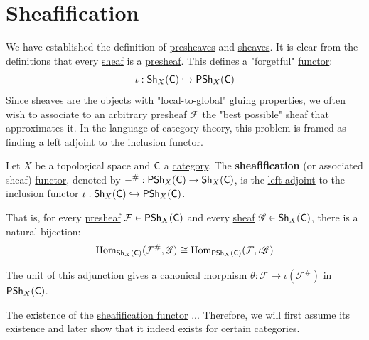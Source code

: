 \documentclass[../../../main]{subfiles}
\begin{document}
\section{Sheafification} \label{sec:sheafification}

We have established the definition of \hyperref[def:presheaf]{presheaves} and \hyperref[def:sheaf]{sheaves}. It is clear from the definitions that every \hyperref[def:sheaf]{sheaf} is a \hyperref[def:presheaf]{presheaf}. This defines a "forgetful" \hyperref[def:functor]{functor}:
\begin{equation*}
    \iota: \mathsf{Sh}_{X}(\mathsf{C}) \hookrightarrow \mathsf{PSh}_{X}(\mathsf{C})
\end{equation*}
Since \hyperref[def:sheaf]{sheaves} are the objects with "local-to-global" gluing properties, we often wish to associate to an arbitrary \hyperref[def:presheaf]{presheaf} \(\mathcal{F}\) the "best possible" \hyperref[def:sheaf]{sheaf} that approximates it. In the language of category theory, this problem is framed as finding a \hyperref[def:adjoint-functors]{left adjoint} to the inclusion functor.

\begin{definition}[Sheafification] \label{def:sheafification}
    Let \(X\) be a topological space and \(\mathsf{C}\) a \hyperref[def:category]{category}.
    The \textbf{sheafification} (or associated sheaf) \hyperref[def:functor]{functor}, denoted by \(-^{\#}: \mathsf{PSh}_{X}(\mathsf{C}) \to \mathsf{Sh}_{X}(\mathsf{C})\), is the \hyperref[def:adjoint-functors]{left adjoint} to the inclusion functor \(\iota: \mathsf{Sh}_{X}(\mathsf{C}) \hookrightarrow \mathsf{PSh}_{X}(\mathsf{C})\).

    That is, for every \hyperref[def:presheaf]{presheaf} \(\mathcal{F} \in \mathsf{PSh}_{X}(\mathsf{C})\) and every \hyperref[def:sheaf]{sheaf} \(\mathscr{G} \in \mathsf{Sh}_{X}(\mathsf{C})\), there is a natural bijection:
    \begin{equation*}
        \operatorname{Hom}_{\mathsf{Sh}_{X}(\mathsf{C})}(\mathcal{F}^{\#}, \mathscr{G}) \cong \operatorname{Hom}_{\mathsf{PSh}_{X}(\mathsf{C})}(\mathcal{F}, \iota\mathscr{G})
    \end{equation*}

    The unit of this adjunction gives a canonical morphism \(\theta: \mathcal{F} \mapsto \iota(\mathcal{F}^{\#})\) in \(\mathsf{PSh}_{X}(\mathsf{C})\).
\end{definition}

The existence of the \hyperref[def:sheafification]{sheafification functor} ...
Therefore, we will first assume its existence and later show that it indeed exists for certain categories.
\end{document}
